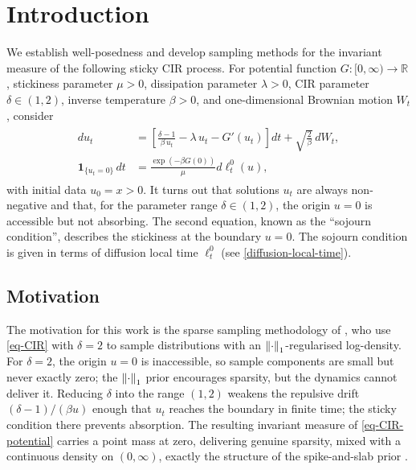 \documentclass[aap,preprint]{imsart}
\DeclarePairedDelimiter{\Vpair}{\|}{\|} %
\newcommand\norm[2][0pt]{\Vpair*{#2}} %
\numberwithin{equation}{section}
\theoremstyle{plain}
\theoremstyle{definition}
\begin{document}

\section{Introduction}
We establish well-posedness and develop sampling methods for the invariant measure of the following sticky CIR process. 
For potential function $G\colon [0,\infty) \to \mathbb{R}$, stickiness parameter $\mu>0$, dissipation parameter $\lambda>0$, CIR parameter $\delta\in(1,2)$,  inverse temperature $\beta>0$, and one-dimensional Brownian motion $W_t $, consider
\begin{gather}
\begin{split}
  \label{eq-CIR-potential}
  du_t &= \left[\frac{\delta-1}{\beta\, u_t} - \lambda\, u_t - G'(u_t)\right] dt + \sqrt{\frac{2}{\beta}}\,dW_t , \\
  \mathbf{1}_{\{u_t=0\}}\,dt&=\frac{\exp(-\beta G(0))}{\mu}d\ell_t^0(u),
\end{split}
\end{gather}
with initial data $u_0=x>0$. It turns out that solutions $u_t$ are always non-negative and that, for the parameter range $\delta\in (1,2)$, the origin $u=0$ is accessible but not absorbing. The second equation, known as the \enquote{sojourn condition}, describes the stickiness at the boundary $u=0$. The sojourn condition is given in terms of diffusion local time $\ell_t^0$ (see \cref{diffusion-local-time}).



\subsection{Motivation}\label{sec:motivation}

The motivation for this work is the sparse sampling methodology of \citet{Cheltsov2025-no}, who use \cref{eq-CIR} with $\delta=2$ to sample distributions with an $\norm{\cdot}_1$-regularised log-density. For $\delta=2$, the origin $u=0$ is inaccessible, so sample components are small but never exactly zero; the $\norm{\cdot}_1$ prior encourages sparsity, but the dynamics cannot deliver it. Reducing $\delta$ into the range $(1,2)$ weakens the repulsive drift $(\delta-1)/(\beta u)$ enough that $u_t$ reaches the boundary in finite time; the sticky condition there prevents absorption. The resulting invariant measure of \cref{eq-CIR-potential} carries a point mass at zero, delivering genuine sparsity, mixed with a continuous density on $(0,\infty)$, exactly the structure of the spike-and-slab prior \citep{Mitchell1988,GeorgeMcCulloch1993}.
\end{document}
